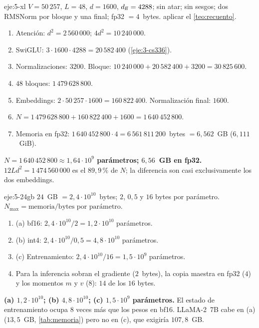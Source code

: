 \begin{solucion}{eje:5-xl}
\datos $V=50\,257$, $L=48$, $d=1600$, $d_{\mathrm{ff}}=4288$; sin atar; sin sesgos; dos RMSNorm por bloque y una final; fp32 $=4$~bytes.
\planteamiento aplicar el \cref{teo:recuento}.
\pasos
\begin{enumerate}[label=\arabic*.]
  \item Atención: $d^{2}=2\,560\,000$; $4d^{2}=10\,240\,000$.
  \item SwiGLU: $3\cdot 1600\cdot 4288=20\,582\,400$ (\cref{eje:3-cs336}).
  \item Normalizaciones: $3200$. Bloque: $10\,240\,000+20\,582\,400+3200=30\,825\,600$.
  \item $48$ bloques: $1\,479\,628\,800$.
  \item Embeddings: $2\cdot 50\,257\cdot 1600=160\,822\,400$. Normalización final: $1600$.
  \item $N=1\,479\,628\,800+160\,822\,400+1600=1\,640\,452\,800$.
  \item Memoria en fp32: $1\,640\,452\,800\cdot 4=6\,561\,811\,200$~bytes $=6{,}562$~GB ($6{,}111$~GiB).
\end{enumerate}
\resultado \textbf{$N=1\,640\,452\,800\approx 1{,}64\cdot 10^{9}$ parámetros; $6{,}56$~GB en fp32.}
\comprobacion $12Ld^{2}=1\,474\,560\,000$ es el $89{,}9\,\%$ de $N$; la diferencia son casi exclusivamente los dos embeddings.
\end{solucion}

\begin{solucion}{eje:5-24gb}
\datos $24$~GB $=2{,}4\cdot 10^{10}$~bytes; $2$, $0{,}5$ y $16$ bytes por parámetro.
\planteamiento $N_{\max}=\text{memoria}/\text{bytes por parámetro}$.
\pasos
\begin{enumerate}[label=\arabic*.]
  \item (a) bf16: $2{,}4\cdot 10^{10}/2=1{,}2\cdot 10^{10}$ parámetros.
  \item (b) int4: $2{,}4\cdot 10^{10}/0{,}5=4{,}8\cdot 10^{10}$ parámetros.
  \item (c) Entrenamiento: $2{,}4\cdot 10^{10}/16=1{,}5\cdot 10^{9}$ parámetros.
  \item Para la inferencia sobran el gradiente ($2$~bytes), la copia maestra en fp32 ($4$) y los momentos $m$ y $v$ ($8$): $14$ de los $16$ bytes.
\end{enumerate}
\resultado \textbf{(a) $1{,}2\cdot 10^{10}$; (b) $4{,}8\cdot 10^{10}$; (c) $1{,}5\cdot 10^{9}$ parámetros.} El estado de entrenamiento ocupa $8$ veces más que los pesos en bf16.
\comprobacion LLaMA-2~7B cabe en (a) ($13{,}5$~GB, \cref{tab:memoria}) pero no en (c), que exigiría $107{,}8$~GB.
\end{solucion}

